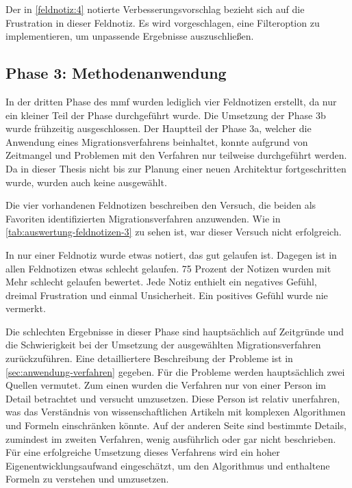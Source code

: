Der in \cref{feldnotiz:4} notierte Verbesserungsvorschlag bezieht sich auf die Frustration in dieser Feldnotiz.
Es wird vorgeschlagen, eine Filteroption zu implementieren, um unpassende Ergebnisse auszuschließen.

\subsection{Phase 3: Methodenanwendung}
\label{sec:feldnotizen-auswertung-phase3}

In der dritten Phase des \gls{mmf} wurden lediglich vier Feldnotizen erstellt, da nur ein kleiner Teil der Phase durchgeführt wurde.
Die Umsetzung der Phase 3b wurde frühzeitig ausgeschlossen.
Der Hauptteil der Phase 3a, welcher die Anwendung eines Migrationsverfahrens beinhaltet, konnte aufgrund von Zeitmangel und Problemen mit den Verfahren nur teilweise durchgeführt werden.
Da in dieser Thesis nicht bis zur Planung einer neuen Architektur fortgeschritten wurde, wurden auch keine \bpp ausgewählt.

Die vier vorhandenen Feldnotizen beschreiben den Versuch, die beiden als Favoriten identifizierten Migrationsverfahren anzuwenden.
Wie in \cref{tab:auswertung-feldnotizen-3} zu sehen ist, war dieser Versuch nicht erfolgreich.

In nur einer Feldnotiz wurde etwas notiert, das gut gelaufen ist.
Dagegen ist in allen Feldnotizen etwas schlecht gelaufen.
75 Prozent der Notizen wurden mit \glqq Mehr schlecht gelaufen\grqq{} bewertet.
Jede Notiz enthielt ein negatives Gefühl, dreimal Frustration und einmal Unsicherheit.
Ein positives Gefühl wurde nie vermerkt.

Die schlechten Ergebnisse in dieser Phase sind hauptsächlich auf Zeitgründe und die Schwierigkeit bei der Umsetzung der ausgewählten Migrationsverfahren zurückzuführen.
Eine detailliertere Beschreibung der Probleme ist in \cref{sec:anwendung-verfahren} gegeben.
Für die Probleme werden hauptsächlich zwei Quellen vermutet.
Zum einen wurden die Verfahren nur von einer Person im Detail betrachtet und versucht umzusetzen.
Diese Person ist relativ unerfahren, was das Verständnis von wissenschaftlichen Artikeln mit komplexen Algorithmen und Formeln einschränken könnte.
Auf der anderen Seite sind bestimmte Details, zumindest im zweiten Verfahren, wenig ausführlich oder gar nicht beschrieben.
Für eine erfolgreiche Umsetzung dieses Verfahrens wird ein hoher Eigenentwicklungsaufwand eingeschätzt, um den Algorithmus und enthaltene Formeln zu verstehen und umzusetzen.

